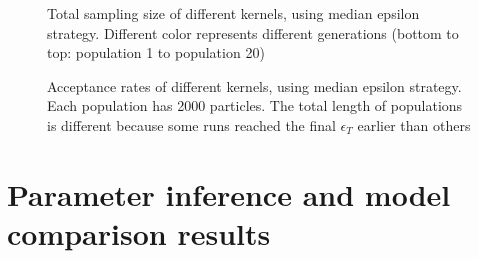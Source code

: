 \begin{figure}[H]

    \begin{center}
    \end{center}

    \caption[Total sampling size of different kernels, using median epsilon strategy]
    {Total sampling size of different kernels, using median epsilon strategy. Different color represents different generations (bottom to top: population 1 to population 20)}
    \label{fig:kernel2}

    \begin{center}
    \end{center}

    \caption[Acceptance rates of different kernels, using median epsilon strategy]
    {Acceptance rates of different kernels, using median epsilon strategy. Each population has 2000 particles. The total length of populations is different because some runs reached the final $\epsilon_T$ earlier than others}
    \label{fig:acceptance2}

\end{figure}


\section{Parameter inference and model comparison results}

